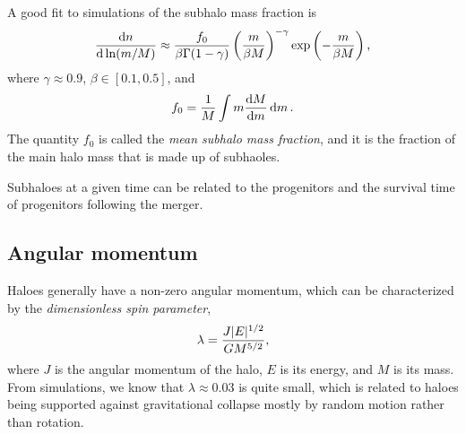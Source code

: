 A good fit to simulations of the subhalo mass fraction is
\begin{align*}
	\dv{n}{\ln(m/M)}
	\approx 
	\frac{f_0}{\beta \Gamma(1-\gamma)}
	\left( \frac{m}{\beta M} \right)^{-\gamma}
	\exp\left( - \frac{m}{\beta M} \right),
\end{align*}
where $\gamma \approx 0.9$, $\beta \in [0.1, 0.5]$, and
\begin{align*}
	f_0
	= \frac{1}{M}
	\int m \dv{M}{m} \dd{m}.
\end{align*}
The quantity $f_0$ is called the \emph{mean subhalo mass fraction}, and it is the fraction of the main halo mass that is made up of subhaoles.

Subhaloes at a given time can be related to the progenitors and the survival time of progenitors following the merger.


\subsection{Angular momentum}
Haloes generally have a non-zero angular momentum, which can be characterized by the \emph{dimensionless spin parameter},
\begin{align*}
	\lambda = \frac{J \vert E\vert^{1/2}}{G M^{5/2}},
\end{align*}
where $J$ is the angular momentum of the halo, $E$ is its energy, and $M$ is its mass.
From simulations, we know that $\lambda \approx 0.03$ is quite small, which is related to haloes being supported against gravitational collapse mostly by random motion rather than rotation.






